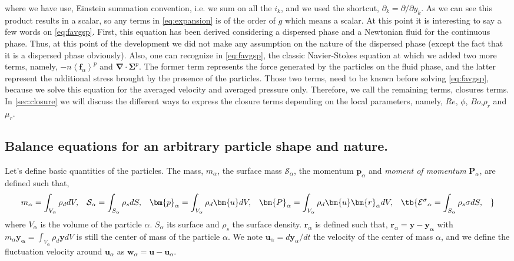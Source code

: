 where we have use, Einstein summation convention, i.e. we sum on all the $i_k$, and we used the shortcut, $\partial_{k} = \partial /\partial y_{k}$. 
As we can see this product results in a scalar, so any terms in \ref{eq:expansion} is of the order of $g$ which means a scalar. 
At this point it is interesting to say a few words on \ref{eq:favgsp}. 
First, this equation has been derived considering a dispersed phase and a Newtonian fluid for the continuous phase.
Thus, at this point of the development we did not make any assumption on the nature of the dispersed phase (except the fact that it is a dispersed phase obviously).   
Also, one can recognize in \ref{eq:favgsp}, the classic Navier-Stokes equation at which we added two more terms, namely, $-n\left<\bm{f}_\alpha\right>^p$ and $\bm{\nabla}\cdot\bm{\Sigma}^p$. 
The former term represents the force generated by the particles on the fluid phase, and the latter represent the additional stress brought by the presence of the particles.
Those two terms, need to be known before solving \ref{eq:favgsp}, because we solve this equation for the averaged velocity and averaged pressure only.
Therefore, we call the remaining terms, closures terms.
In \ref{sec:closure} we will discuss the different ways to express the closure terms depending on the local parameters, namely, $Re$, $\phi$, $Bo$,$\rho_r$ and $\mu_r$.

\subsection{Balance equations for an arbitrary particle shape and nature.}
Let's define basic quantities of the particles. 
The mass, $m_\alpha$, the surface mass $\mathcal{S}_\alpha$, the momentum $\textbf{p}_\alpha$ and \textit{moment of momentum} $\bm{P}_\alpha$,
are defined such that,
\begin{equation}
    m_\alpha = \int_{V_\alpha} \rho_d dV,\;\;\;
    \mathcal{S}_\alpha = \int_{S_\alpha} \rho_s dS,\;\;\;
    \bm{p}_\alpha = \int_{V_\alpha} \rho_d \bm{u} dV,\;\;\;
    \bm{P}_\alpha = \int_{V_\alpha} \rho_d \bm{u}\bm{r}_\alpha dV,\;\;\;
    \tb{
    \mathcal{E^\sigma}_\alpha = \int_{S_\alpha} \rho_s \sigma dS,\;\;\;
}
\end{equation}
where $V_\alpha$ is the volume of the particle $\alpha$.
$S_\alpha$ its surface and $\rho_s$ the surface density. 
$\bm{r}_\alpha$ is defined such that, $\bm{r}_\alpha = \bm{y} - \bm{y_\alpha}$ with $m_\alpha\bm{y_\alpha} = \int_{V_\alpha} \rho_d\bm{y}dV$ is still the center of mass of the particle $\alpha$. 
We note $\bm{u}_\alpha = d\bm{y}_\alpha/dt$ the velocity of the center of mass $\alpha$, and we define the fluctuation velocity around $\bm{u}_\alpha$ as $\bm{w}_\alpha = \bm{u} - \bm{u}_\alpha$.

